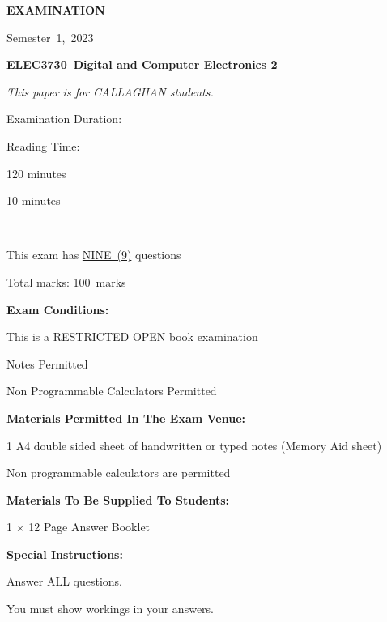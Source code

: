\documentclass[a4paper,12pt]{article}
\newcommand{\semester}{1} %
\newcommand{\examyear}{2023} %
\newcommand{\subjectname}{Digital and Computer Electronics 2} %
\newcommand{\modulecode}{ELEC3730} %
\newcommand{\totalqn}{NINE~(9)} %
\newcommand{\totalmarks}{100} %
\newcounter{question}[section]
\begin{document}
\begin{doublespace}
\begin{center}
    \textbf{\large EXAMINATION}

    
    \textnormal{\footnotesize Semester~\semester,~\examyear}

    
    \textbf{\large \modulecode~\subjectname}


    \textit{\footnotesize This paper is for CALLAGHAN students.}
  \end{center}

  {\footnotesize

    \begin{minipage}[t]{0.33\linewidth}
      
      \footnotesize

      Examination Duration:

      Reading Time:

    \end{minipage}
    \begin{minipage}[t]{0.3\linewidth}
      
      \footnotesize

      120 minutes

      10 minutes

    \end{minipage}\\

    \vspace{-1mm}

    This exam has \underline{\totalqn} questions
    
    Total marks: \totalmarks~marks


    \textbf{Exam Conditions:}

    This is a RESTRICTED OPEN book examination

    Notes Permitted

    Non Programmable Calculators Permitted


    \textbf{Materials Permitted In The Exam Venue:}

    1 A4 double sided sheet of handwritten or typed notes (Memory Aid sheet)

    Non programmable calculators are permitted


    \textbf{Materials To Be Supplied To Students:}

    1 $\times$ 12 Page Answer Booklet


    \textbf{Special Instructions:}
    
    Answer ALL questions.
    
    You must show workings in your answers.

    {\ }}
\end{doublespace}
\end{document}
